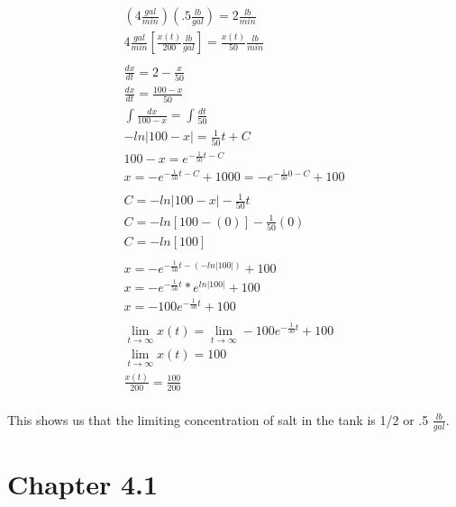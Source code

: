 \documentclass{article}
\begin{document}
\begin{gather*}
    \left(4\frac{gal}{min}\right)\left(.5\frac{lb}{gal}\right) = 2\frac{lb}{min}\\
    4\frac{gal}{min}\left[\frac{x(t)}{200}\frac{lb}{gal}\right]=\frac{x(t)}{50}\frac{lb}{min}\\\\
    \frac{dx}{dt}= 2-\frac{x}{50}\\
    \frac{dx}{dt}=\frac{100-x}{50}\\
    \int \frac{dx}{100-x} = \int \frac{dt}{50}\\
    -ln|100-x| = \frac{1}{50}t+C\\
    100-x = e^{-\frac{1}{50}t-C}\\
    x = -e^{-\frac{1}{50}t-C} + 100
    0 = -e^{-\frac{1}{50}0-C} + 100\\\\
    C = -ln|100-x|-\frac{1}{50}t\\
    C = -ln[100-(0)]-\frac{1}{50}(0)\\
    C = -ln[100]\\\\
    x = -e^{-\frac{1}{50}t-(-ln|100|)} + 100\\
    x = -e^{-\frac{1}{50}t} * e^{ln|100|}+100\\
    x = -100e^{-\frac{1}{50}t}+100\\\\
    \lim_{t\to\infty}x(t) = \lim_{t\to\infty}-100e^{-\frac{1}{50}t}+100\\
    \lim_{t\to\infty}x(t) = 100\\
    \frac{x(t)}{200} = \frac{100}{200}\\
\end{gather*}
\begin{center}
    This shows us that the limiting concentration of salt in the tank is 1/2 or .5 $\frac{lb}{gal}$.
\end{center}
\newpage\section*{Chapter 4.1}
\end{document}
